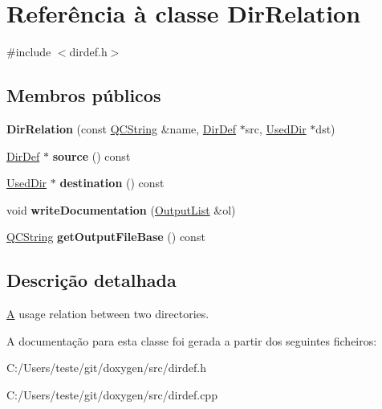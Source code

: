 \hypertarget{class_dir_relation}{\section{Referência à classe Dir\-Relation}
\label{class_dir_relation}
}


{\ttfamily \#include $<$dirdef.\-h$>$}

\subsection*{Membros públicos}
\begin{DoxyCompactItemize}
\item 
\hypertarget{class_dir_relation_a9bfbded189c5059967f1ed79e54319a3}{{\bfseries Dir\-Relation} (const \hyperlink{class_q_c_string}{Q\-C\-String} \&name, \hyperlink{class_dir_def}{Dir\-Def} $\ast$src, \hyperlink{class_used_dir}{Used\-Dir} $\ast$dst)}\label{class_dir_relation_a9bfbded189c5059967f1ed79e54319a3}

\item 
\hypertarget{class_dir_relation_aff111292cfb4d3878e276c5e9add1f36}{\hyperlink{class_dir_def}{Dir\-Def} $\ast$ {\bfseries source} () const }\label{class_dir_relation_aff111292cfb4d3878e276c5e9add1f36}

\item 
\hypertarget{class_dir_relation_adcc414d75dec8f467e71c180db09678c}{\hyperlink{class_used_dir}{Used\-Dir} $\ast$ {\bfseries destination} () const }\label{class_dir_relation_adcc414d75dec8f467e71c180db09678c}

\item 
\hypertarget{class_dir_relation_a0c85f3695c99f7b1aeb762bbdabc8d62}{void {\bfseries write\-Documentation} (\hyperlink{class_output_list}{Output\-List} \&ol)}\label{class_dir_relation_a0c85f3695c99f7b1aeb762bbdabc8d62}

\item 
\hypertarget{class_dir_relation_af72a982ba8198cd5c98e9fc850b71df6}{\hyperlink{class_q_c_string}{Q\-C\-String} {\bfseries get\-Output\-File\-Base} () const }\label{class_dir_relation_af72a982ba8198cd5c98e9fc850b71df6}

\end{DoxyCompactItemize}


\subsection{Descrição detalhada}
\hyperlink{class_a}{A} usage relation between two directories. 

A documentação para esta classe foi gerada a partir dos seguintes ficheiros\-:\begin{DoxyCompactItemize}
\item 
C\-:/\-Users/teste/git/doxygen/src/dirdef.\-h\item 
C\-:/\-Users/teste/git/doxygen/src/dirdef.\-cpp\end{DoxyCompactItemize}
